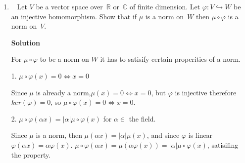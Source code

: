\documentclass[11pt]{article}
\newcommand\score[1]{\marginpar{\vspace{-2ex}\color{blue}{#1/3}}\hspace{-1ex}}
\newcommand\0{\mathbf{0}}
\newcommand\CC{\mathbb{C}}
\newcommand\RR{\mathbb{R}}
\newcommand\into{\hookrightarrow}
\newcommand\<{\langle}
\renewcommand\>{\rangle}
\begin{document}
\begin{enumerate}
\begin{align*}
  v_1= \begin{bmatrix}
   -1 \\
    -1 \\
    1 \\
    0
  \end{bmatrix} \\
  v_2 = \begin{bmatrix}
    -1 \\
   -1 \\
    0 \\
    1
  \end{bmatrix}
\end{align*}

The geometric multiplicities are 2,3 and 4 for $(A-6I), (A-6I)^2,$ and $(A-6I)^3$ respectively.
So the matrix's jordan form is as below.

\begin{align}
  \begin{bmatrix}
    6 & 0 & 0 & 0\\
    0 & 6 & 1 & 0\\
    0 & 0 & 6 & 1\\
    0 & 0 & 0 & 6
  \end{bmatrix}
\end{align}


\pagebreak





\item\ \score{}%
Let $V$ be a vector space over~$\RR$ or~$\CC$ of finite dimension.
Let $\varphi: V \into W$ be an injective homomorphism.  Show that if
$\mu$ is a norm on~$W$ then $\mu \circ \varphi$ is a norm on~$V$.


\textbf{Solution}


For $\mu \circ \varphi$ to be a norm on $W$ it has to satisify 
certain properities of a norm.

1. $\mu \circ \varphi(x)=0 \Leftrightarrow x=0$

Since $\mu$ is already a norm,$\mu (x)=0 \Leftrightarrow x=0$, but $\varphi$
is injective therefore $ker(\varphi) = {0}$, so $\mu \circ \varphi(x)=0 \Leftrightarrow x=0$.

2. $\mu \circ \varphi(\alpha x)=|\alpha| \mu \circ \varphi(x)$ for $\alpha \in $ the field.

Since $\mu$ is a norm, then $\mu(\alpha x) = |\alpha| \mu (x)$, and since $\varphi$ is linear $\varphi(\alpha x)=\alpha \varphi (x)$. 
$\mu \circ \varphi(\alpha x)= \mu(\alpha \varphi(x) ) = |\alpha| \mu \circ \varphi(x)$, satisifing the property.


\end{enumerate}
\end{document}
